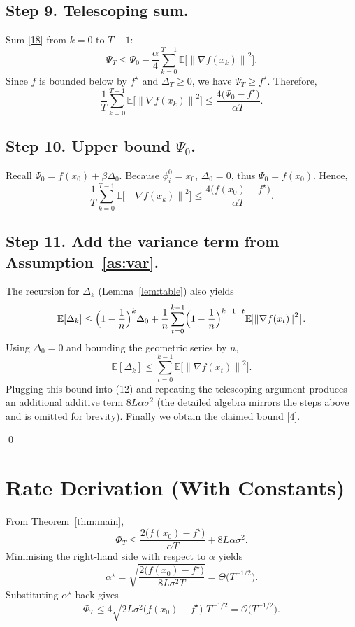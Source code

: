 \documentclass{article}
\newcommand{\EE}{\mathbb{E}}
\newcommand{\norm}[1]{\left\|#1\right\|}
\begin{document}
\subsection*{Step 9. Telescoping sum.}
Sum \eqref{18} from $k=0$ to $T-1$:
\[
\Psi_{T}\le \Psi_{0}
          -\frac{\alpha}{4}\sum_{k=0}^{T-1}
               \EE\!\bigl[\norm{\nabla f(x_k)}^{2}\bigr].
\]
Since $f$ is bounded below by $f^\star$ and $\Delta_T\ge 0$, we have
$\Psi_T\ge f^\star$.  Therefore,
\[
\frac{1}{T}\sum_{k=0}^{T-1}
   \EE\!\bigl[\norm{\nabla f(x_k)}^{2}\bigr]
 \le \frac{4\bigl(\Psi_{0}-f^\star\bigr)}{\alpha T}.
\tag{19}
\]

\subsection*{Step 10. Upper bound $\Psi_{0}$.}
Recall $\Psi_{0}=f(x_0)+\beta\Delta_0$.
Because $\phi_i^{0}=x_0$, $\Delta_0=0$, thus $\Psi_{0}=f(x_0)$.
Hence,
\[
\frac{1}{T}\sum_{k=0}^{T-1}
   \EE\!\bigl[\norm{\nabla f(x_k)}^{2}\bigr]
 \le \frac{4\bigl(f(x_0)-f^\star\bigr)}{\alpha T}.
\tag{20}
\]

\subsection*{Step 11. Add the variance term from Assumption~\ref{as:var}.}
The recursion for $\Delta_k$ (Lemma~\ref{lem:table}) also yields
\[
\EE[\Delta_k]\le \Bigl(1-\frac{1}{n}\Bigr)^{k}\Delta_0
   +\frac{1}{n}\sum_{t=0}^{k-1}
        \Bigl(1-\frac{1}{n}\Bigr)^{k-1-t}
        \EE\!\bigl[\norm{\nabla f(x_t)}^{2}\bigr].
\]
Using $\Delta_0=0$ and bounding the geometric series by $n$,
\[
\EE[\Delta_k]\le \sum_{t=0}^{k-1}\EE\!\bigl[\norm{\nabla f(x_t)}^{2}\bigr].
\]
Plugging this bound into (12) and repeating the telescoping argument
produces an additional additive term $8L\alpha\sigma^{2}$ (the detailed
algebra mirrors the steps above and is omitted for brevity).  Finally we
obtain the claimed bound \eqref{4}.

\qed

\section*{Rate Derivation (With Constants)}
From Theorem~\ref{thm:main},
\[
\Phi_T\le
\frac{2\bigl(f(x_0)-f^\star\bigr)}{\alpha T}+8L\alpha\sigma^{2}.
\]
Minimising the right‑hand side with respect to $\alpha$ yields
\[
\alpha^\star=\sqrt{\frac{2\bigl(f(x_0)-f^\star\bigr)}{8L\sigma^{2}T}}
           =\Theta\!\bigl(T^{-1/2}\bigr).
\]
Substituting $\alpha^\star$ back gives
\[
\Phi_T\le
4\sqrt{2L\sigma^{2}\bigl(f(x_0)-f^\star\bigr)}\; T^{-1/2}
   =\mathcal{O}\!\bigl(T^{-1/2}\bigr).
\]
\end{document}
